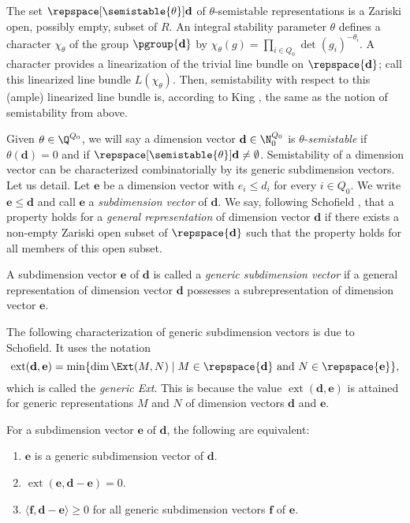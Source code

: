 \documentclass[11pt, a4paper]{amsart}
\begin{document}
	The set $\repspace[\semistable{\theta}]{\mathbf{d}}$ of $\theta$-semistable representations is a Zariski open, possibly empty, subset of $R$. An integral stability parameter $\theta$ defines a character $\chi_\theta$ of the group $\pgroup{\mathbf{d}}$ by $\chi_\theta(g) = \prod_{i \in Q_0} \det(g_i)^{-\theta_i}$. A character provides a linearization of the trivial line bundle on $\repspace{\mathbf{d}}$; call this linearized line bundle $L(\chi_\theta)$. Then, semistability with respect to this (ample) linearized line bundle is, according to King , the same as the notion of semistability from above.
	
	Given $\theta \in \Q^{Q_0}$, we will say a dimension vector $\mathbf{d} \in \N_0^{Q_0}$ is $\theta$-\emph{semistable} if $\theta(\mathbf{d}) = 0$ and if $\repspace[\semistable{\theta}]{\mathbf{d}} \neq \emptyset$. Semistability of a dimension vector can be characterized combinatorially by its generic subdimension vectors. Let us detail. Let $\mathbf{e}$ be a dimension vector with $e_i \leq d_i$ for every $i \in Q_0$. We write $\mathbf{e} \leq \mathbf{d}$ and call $\mathbf{e}$ a \emph{subdimension vector} of $\mathbf{d}$. We say, following Schofield , that a property holds for a \emph{general representation} of dimension vector $\mathbf{d}$ if there exists a non-empty Zariski open subset of $\repspace{\mathbf{d}}$ such that the property holds for all members of this open subset.
	
	\begin{defn*}
		A subdimension vector $\mathbf{e}$ of $\mathbf{d}$ is called a \emph{generic subdimension vector} if a general representation of dimension vector $\mathbf{d}$ possesses a subrepresentation of dimension vector $\mathbf{e}$.
	\end{defn*}
	
	The following characterization of generic subdimension vectors is due to Schofield. It uses the notation
	\[
		\operatorname{ext}(\mathbf{d},\mathbf{e}) = \min\{ \dim \Ext(M,N) \mid M \in \repspace{\mathbf{d}} \text{ and } N \in \repspace{\mathbf{e}}\},
	\]
	which is called the \emph{generic Ext}. This is because the value $\operatorname{ext}(\mathbf{d},\mathbf{e})$ is attained for generic representations $M$ and $N$ of dimension vectors $\mathbf{d}$ and $\mathbf{e}$.
	
	\begin{thm}
		For a subdimension vector $\mathbf{e}$ of $\mathbf{d}$, the following are equivalent:
		\begin{enumerate}
			\item $\mathbf{e}$ is a generic subdimension vector of $\mathbf{d}$.
			\item $\operatorname{ext}(\mathbf{e},\mathbf{d}-\mathbf{e}) = 0$.
			\item $\langle \mathbf{f},\mathbf{d}-\mathbf{e} \rangle \geq 0$ for all generic subdimension vectors $\mathbf{f}$ of $\mathbf{e}$.
		\end{enumerate}
	\end{thm}
\end{document}
